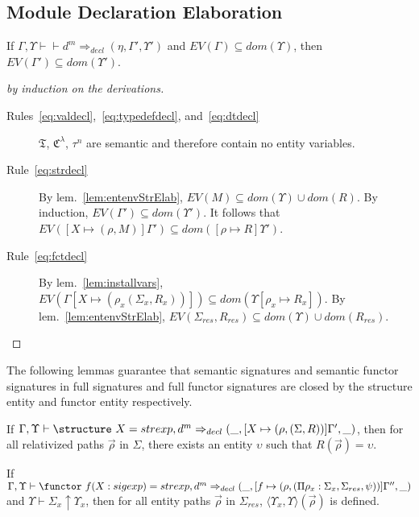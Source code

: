 \subsection{Module Declaration Elaboration}
\begin{lemma}
If $\Gamma,\Upsilon\vdash \vdash d^m \Rightarrow_{decl} (\eta, \Gamma', \Upsilon')$ and $EV(\Gamma)\subseteq dom(\Upsilon)$, then $EV(\Gamma')\subseteq dom(\Upsilon')$. 
\end{lemma}
\begin{proof}[by induction on the derivations]
\begin{description}
\item[Rules~\ref{eq:valdecl},~\ref{eq:typedefdecl}, and~\ref{eq:dtdecl}] $\mathfrak{T}$, $\mathfrak{C}^\lambda$, $\tau^n$ are semantic and therefore contain no entity variables. 
\item[Rule~\ref{eq:strdecl}]  By lem.~\ref{lem:entenvStrElab}, $EV(M) \subseteq dom(\Upsilon)\cup dom(R)$. By induction, $EV(\Gamma')\subseteq dom(\Upsilon')$. It follows that $EV([X\mapsto(\rho,M)]\Gamma') \subseteq dom([\rho\mapsto R]\Upsilon')$. 
\item[Rule~\ref{eq:fctdecl}] By lem.~\ref{lem:installvars}, $EV(\Gamma[X\mapsto(\rho_x(\Sigma_x,R_x))]) \subseteq dom(\Upsilon[\rho_x\mapsto R_x])$. By lem.~\ref{lem:entenvStrElab}, $EV(\Sigma_{res},R_{res})\subseteq dom(\Upsilon)\cup dom(R_{res})$. 
\end{description}
\end{proof}

The following lemmas guarantee that semantic signatures and semantic
functor signatures in full signatures and full functor signatures
are closed by the structure entity and functor entity respectively. 

\begin{lemma}\label{lem:RclosesSigInFullSig}
If $\Gamma,\Upsilon\vdash \structure~X=strexp,d^m\Rightarrow_{decl} (\_, [X\mapsto(\rho,(\Sigma,R))]\Gamma', \_)$, then for all relativized paths $\vec{\rho}$ in $\Sigma$, there exists an entity $\upsilon$ such that $R(\vec{\rho})=\upsilon$.
\end{lemma}

\begin{lemma}
If $\Gamma,\Upsilon\vdash \functor~f(X:sigexp)=strexp,d^m 
\Rightarrow_{decl}
(\_,[f\mapsto(\rho,(\Pi\rho_x:\Sigma_x,\Sigma_{res},\psi))]\Gamma'',\_)$
and $\Upsilon\vdash\Sigma_x\uparrow\Upsilon_x$,
then for all entity paths $\vec{\rho}$ in $\Sigma_{res}$, 
$\langle\Upsilon_x,\Upsilon\rangle(\vec{\rho})$ is defined. 
\end{lemma}


